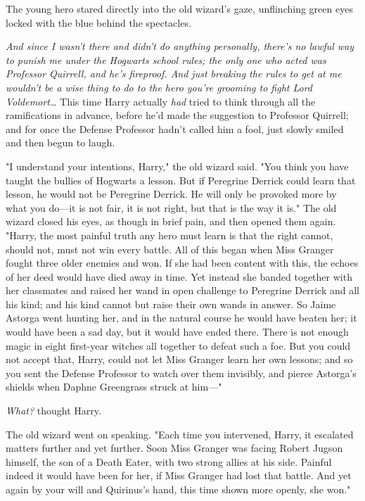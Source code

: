 The young hero stared directly into the old wizard's gaze, unflinching green 
eyes locked with the blue behind the spectacles.

\emph{And since I wasn't there and didn't do anything personally, there's no 
lawful way to punish me under the Hogwarts school rules; the only one who acted 
was Professor Quirrell, and he's fireproof. And just breaking the rules to get 
at me wouldn't be a wise thing to do to the hero you're grooming to fight Lord 
Voldemort{\ldots}} This time Harry actually \emph{had} tried to think through 
all the ramifications in advance, before he'd made the suggestion to Professor 
Quirrell; and for once the Defense Professor hadn't called him a fool, just 
slowly smiled and then begun to laugh.

"I understand your intentions, Harry," the old wizard said. "You think you have 
taught the bullies of Hogwarts a lesson. But if Peregrine Derrick could learn 
that lesson, he would not be Peregrine Derrick. He will only be provoked more 
by what you do---it is not fair, it is not right, but that is the way it is." 
The old wizard closed his eyes, as though in brief pain, and then opened them 
again. "Harry, the most painful truth any hero must learn is that the right 
cannot, should not, must not win every battle. All of this began when Miss 
Granger fought three older enemies and won. If she had been content with this, 
the echoes of her deed would have died away in time. Yet instead she banded 
together with her classmates and raised her wand in open challenge to Peregrine 
Derrick and all his kind; and his kind cannot but raise their own wands in 
answer. So Jaime Astorga went hunting her, and in the natural course he would 
have beaten her; it would have been a sad day, but it would have ended there. 
There is not enough magic in eight first-year witches all together to defeat 
such a foe. But you could not accept that, Harry, could not let Miss Granger 
learn her own lessons; and so you sent the Defense Professor to watch over them 
invisibly, and pierce Astorga's shields when Daphne Greengrass struck at him---"

\emph{What?} thought Harry.

The old wizard went on speaking. "Each time you intervened, Harry, it escalated 
matters further and yet further. Soon Miss Granger was facing Robert Jugson 
himself, the son of a Death Eater, with two strong allies at his side. Painful 
indeed it would have been for her, if Miss Granger had lost that battle. And 
yet again by your will and Quirinus's hand, this time shown more openly, she 
won."

